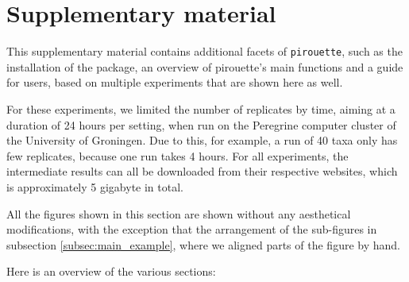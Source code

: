 \section{Supplementary material}


This supplementary material contains additional facets of \verb;pirouette;, 
such as the installation of the package, an overview of
pirouette's main functions and a guide for users, based on multiple experiments
that are shown here as well.

For these experiments, we limited the number of replicates by time, 
aiming at a duration of
24 hours per setting, when run on the Peregrine computer cluster of the
University of Groningen. Due to this, for example, a run of 40 taxa only
has few replicates, because one run takes 4 hours. For all experiments, the intermediate results can all be downloaded 
from their respective websites, which is approximately 5 gigabyte in total.

All the figures shown in this section are shown without any aesthetical modifications, with the exception that the arrangement
of the sub-figures in subsection \ref{subsec:main_example},
where we aligned parts of the figure by hand.

Here is an overview of the various sections:

